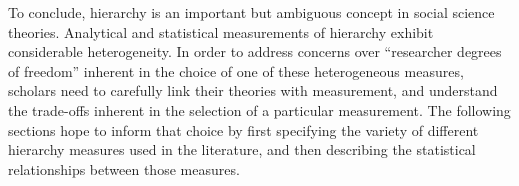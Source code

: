 \documentclass[3p,times]{elsarticle}
\begin{document}
To conclude, hierarchy is an important but ambiguous concept in social science theories. Analytical and statistical measurements of hierarchy exhibit considerable heterogeneity. In order to address concerns over ``researcher degrees of freedom'' inherent in the choice of one of these heterogeneous measures, scholars need to carefully link their theories with measurement, and understand the trade-offs inherent in the selection of a particular measurement. The following sections hope to inform that choice by first specifying the variety of different hierarchy measures used in the literature, and then describing the statistical relationships between those measures.



\end{document}
